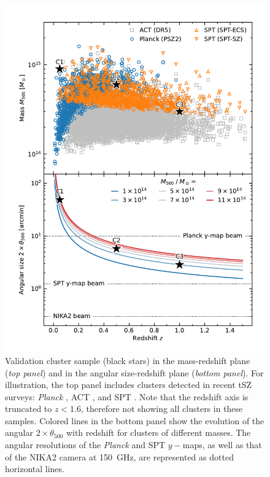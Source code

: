 \begin{figure}[tp]
    \centering
    \includegraphics[width=\linewidth]{Figures/validation_sample.pdf}
    \caption{
        Validation cluster sample (black stars) in the mass-redshift plane (\textit{top panel}) and in the angular size-redshift plane (\textit{bottom panel}).
        For illustration, the top panel includes clusters detected in recent tSZ surveys: \textit{Planck} \citep{planck_collaboration_planck_2016-2}, ACT \citep{hilton_atacama_2021}, and SPT \citep{bleem_sptpol_2020,bleem_galaxy_2015}.
        Note that the redshift axis is truncated to $z<1.6$, therefore not showing all clusters in these samples.
        Colored lines in the bottom panel show the evolution of the angular $2\times\theta_{500}$ with redshift for clusters of different masses.
        The angular resolutions of the \textit{Planck} and SPT $y-$maps, as well as that of the NIKA2 camera at 150~GHz, are represented as dotted horizontal lines.
    }
    \label{fig:valid:sample}
\end{figure}

